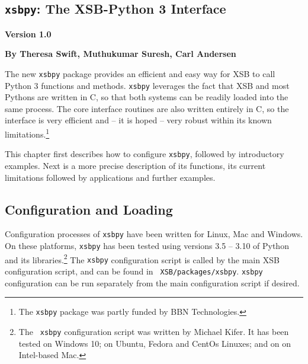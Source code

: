 
\newcommand{\xsbpyversion}{Version 1.0}

\begin{center}
\chapter[XSB and Python]{{\tt xsbpy}: The XSB-Python 3 Interface} \label{chap:xsbpy}
\end{center}

\vspace*{-.30in} 
\begin{center}
{\Large {\bf  \xsbpyversion}}
\end{center}

\begin{center}
  {\Large {\bf By Theresa Swift, Muthukumar Suresh, Carl Andersen}}
\end{center}

\noindent

%

The new {\tt xsbpy} package provides an efficient and easy way for XSB
to call Python 3 functions and methods.  {\tt xsbpy} leverages the
fact that XSB and most Pythons are written in C, so that both systems
can be readily loaded into the same process. The core interface
routines are also written entirely in C, so the interface is very
efficient and -- it is hoped -- very robust within its known
limitations.\footnote{The {\tt xsbpy} package was partly funded by BBN
  Technologies.}

This chapter first describes how to configure {\tt xsbpy}, followed by
introductory examples.  Next is a more precise description of its
functions, its current limitations followed by applications and
further examples.

\section{Configuration and Loading}

Configuration processes of {\tt xsbpy} have been written for Linux, Mac
and Windows.  On these platforms, {\tt xsbpy} has been tested using
versions 3.5 -- 3.10 of Python and its libraries.\footnote{The {\tt
    xsbpy} configuration script was written by Michael Kifer.  It has
  been tested on Windows 10; on Ubuntu, Fedora and CentOs Linuxes; and
  on on Intel-based Mac.}  The {\tt xsbpy} configuration script is
called by the main XSB configuration script, and can be found in {\tt
  XSB/packages/xsbpy}.  {\tt xsbpy} configuration can be run
separately from the main configuration script if desired.


